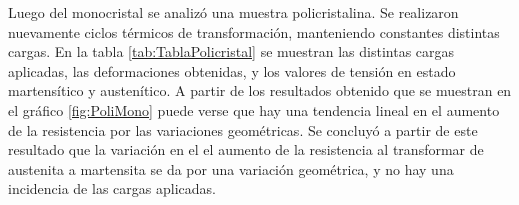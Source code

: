 \documentclass[a4paper,12pt,fleqn,twoside,openany]{book}
\begin{document}
 
Luego del monocristal se analizó una muestra policristalina. Se realizaron nuevamente ciclos térmicos de transformación, manteniendo constantes distintas cargas. En la tabla \ref{tab:TablaPolicristal} se muestran las distintas cargas aplicadas, las deformaciones obtenidas, y los valores de tensión en estado martensítico y austenítico. A partir de los resultados obtenido que se muestran en el gráfico \ref{fig:PoliMono} puede verse que hay una tendencia lineal en el aumento de la resistencia por las variaciones geométricas. Se concluyó a partir de este resultado que la variación en el el aumento de la resistencia al transformar de austenita a martensita se da por una variación geométrica, y no hay una incidencia de las cargas aplicadas. 
 
\end{document}
